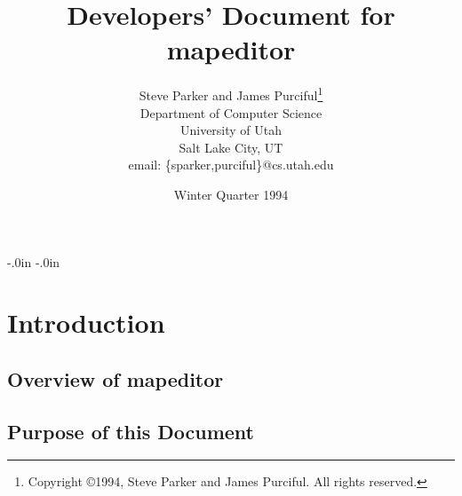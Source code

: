 % 
% 
%

\topmargin -0.45in
\textheight 9.0in
\oddsidemargin -.0in
\evensidemargin -.0in
\textwidth 6.5in





\setlength{\baselineskip}{1.2\baselineskip}

\setlength{\parskip}{\smallskipamount}


\title {Developers' Document for\\
mapeditor}

\author {Steve Parker and James Purciful\thanks{Copyright \copyright 1994,
Steve Parker and James Purciful.  All rights reserved.}\\ 
Department of Computer Science\\ 
University of Utah\\ 
Salt Lake City, UT\\ 
email: \{sparker,purciful\}@cs.utah.edu}

\date {Winter Quarter 1994}



\maketitle

\tableofcontents



\chapter{Introduction}


\section{Overview of mapeditor}


\section{Purpose of this Document}


